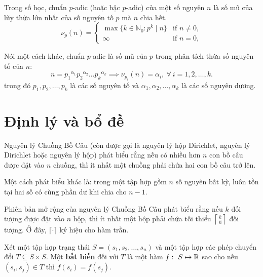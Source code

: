 \documentclass[../imo-training-open-book.tex]{subfiles}
\begin{document}
\begin{definition*} 
    \label{theorem:p-adic-valuation}
    Trong số học, chuẩn \( p \)-adic (hoặc bậc \( p \)-adic) của một số nguyên \( n \) là số mũ của lũy thừa lớn nhất của số nguyên tố \( p \) mà \( n \) chia hết.
    \[
        \nu_p(n) = 
        \begin{cases}
            \max \{ k \in \mathbb{N}_0 : p^k \mid n \} & \text{if } n \neq 0, \\
            \infty & \text{if } n = 0,
        \end{cases}
    \]

    Nói một cách khác, chuẩn \( p \)-adic là số mũ của \( p \) trong phân tích thừa số nguyên tố của \( n \):
    \[
        n={p_{1}}^{\alpha _{1}}{p_{2}}^{\alpha _{2}}{\dots }{p_{k}}^{\alpha _{k}} \implies \nu_{p_i}(n) = \alpha_i,\ \forall\ i=1,2,\ldots,k.
    \]
    trong đó $p_{1},p_{2},\ldots,p_{k}$ là các số nguyên tố và $\alpha _{1},\alpha _{2},\dots ,\alpha _{k}$ là các số nguyên dương.
\end{definition*}

\newpage

\chapter{Định lý và bổ đề}

\begin{theorem*}
    \label{theorem:pigeonhole-principle}
    Nguyên lý Chuồng Bồ Câu (còn được gọi là nguyên lý hộp Dirichlet, nguyên lý Dirichlet hoặc nguyên lý hộp)
    phát biểu rằng nếu có nhiều hơn \( n \) con bồ câu được đặt vào \( n \) chuồng, thì ít nhất một chuồng phải chứa hai con bồ câu trở lên.
    
    Một cách phát biểu khác là: trong một tập hợp gồm \( n \) số nguyên bất kỳ, luôn tồn tại hai số có cùng phần dư khi chia cho \( n-1 \).

    Phiên bản mở rộng của nguyên lý Chuồng Bồ Câu phát biểu rằng nếu \( k \) đối tượng được đặt vào \( n \) hộp,
    thì ít nhất một hộp phải chứa tối thiểu \( \left\lceil \frac{k}{n} \right\rceil \) đối tượng.
    Ở đây, \( \lceil \cdot \rceil \) ký hiệu cho hàm trần.
\end{theorem*}

\begin{theorem*}
    \label{theorem:invariant-principle}
    Xét một tập hợp trạng thái \( S = (s_1, s_2, \ldots, s_n) \) và một tập hợp các phép chuyển đổi \( T \subseteq S \times S \).
    Một \textbf{bất biến} đối với \( T \) là một hàm \( f:\ S \mapsto \mathbb R \)
    sao cho nếu \( (s_i, s_j) \in T \) thì \( f(s_i) = f(s_j) \).
\end{theorem*}
\end{document}
